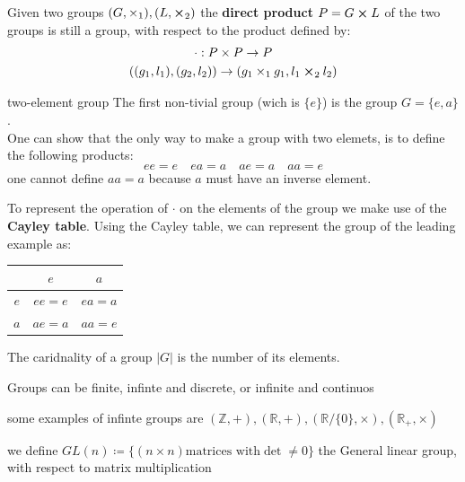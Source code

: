 \begin{claim}
  Given two groups $(G, \times_1), (L,\cross_2)$ the {\bf direct product} $P = G \cross L$ of the two groups is still a group, with respect to the product defined by:
  \begin{gather*}
    \cdot : P \times P \rightarrow P \\
    ((g_1,l_1), (g_2,l_2)) \rightarrow (g_1\times_1g_1, l_1\cross_2l_2)
  \end{gather*}
\end{claim}

\begin{example}{two-element group}
  The first non-tivial group (wich is $\{e\}$) is the group $G = \{e,a\}$.
  \\
  One can show that the only way to make a group with two elemets, is to define the following products:
  \[
    ee = e \quad ea = a \quad ae = a \quad aa=e
  \]
  one cannot define $ aa=a$ because $a$ must have an inverse element.
\end{example}
To represent the operation of $\cdot$ on the elements of the group we make use of the {\bf Cayley table}. Using the Cayley table, we can represent the group of the leading example as:
    
\begin{center}
  \begin{tabular}{c|cc}
    & $e$ & $a$ \\
    \hline
    $e$ & $ee=e$& $ea = a$ \\
    $a$ & $ ae = a$ & $aa = e$
  \end{tabular}
\end{center}

\begin{definition}[cardinality]
  The caridnality of a group $|G|$ is the number of its elements.
\end{definition}
Groups can be finite, infinte and discrete, or infinite and continuos
\begin{example}
  some examples of infinte groups are $(\mathbb{Z}, +), (\mathbb{R},+), (\mathbb{R} / \{0\}, \times), (\mathbb{R}_+, \times)$
\end{example}
\begin{definition}
  we define $GL(n) \coloneq \{(n\times n) \text{matrices with} \det \neq 0 \}$ the General linear group, with respect to matrix multiplication
\end{definition}

